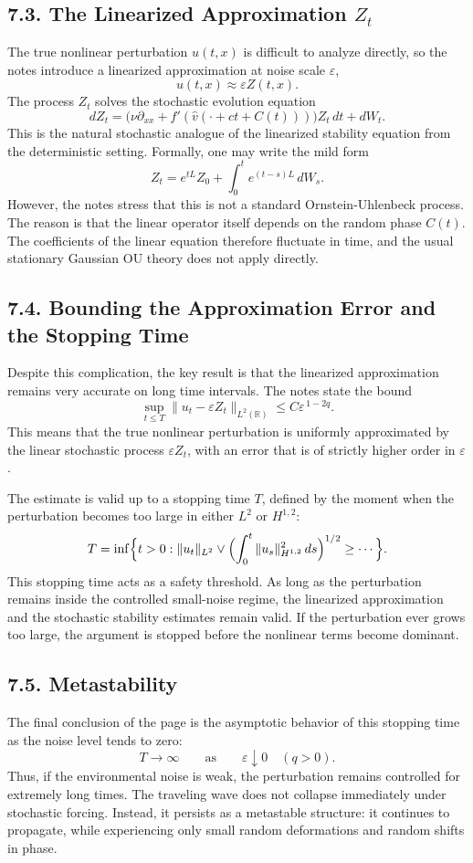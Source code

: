 \documentclass[11pt]{article}
\theoremstyle{definition}
\theoremstyle{remark}
\begin{document}
\subsection*{7.3. The Linearized Approximation \(Z_t\)}
The true nonlinear perturbation \(u(t,x)\) is difficult to analyze directly, so the notes introduce a linearized approximation at noise scale \(\varepsilon\),
\[
u(t,x)\approx \varepsilon Z(t,x).
\]
The process \(Z_t\) solves the stochastic evolution equation
\[
dZ_t=\bigl(\nu\partial_{xx}+f'(\widehat v(\cdot+ct+C(t)))\bigr)Z_t\,dt+dW_t.
\]
This is the natural stochastic analogue of the linearized stability equation from the deterministic setting. Formally, one may write the mild form
\[
Z_t=e^{tL}Z_0+\int_0^t e^{(t-s)L}\,dW_s.
\]
However, the notes stress that this is not a standard Ornstein-Uhlenbeck process. The reason is that the linear operator itself depends on the random phase \(C(t)\). The coefficients of the linear equation therefore fluctuate in time, and the usual stationary Gaussian OU theory does not apply directly.

\subsection*{7.4. Bounding the Approximation Error and the Stopping Time}
Despite this complication, the key result is that the linearized approximation remains very accurate on long time intervals. The notes state the bound
\[
\sup_{t\le T}\|u_t-\varepsilon Z_t\|_{L^2(\mathbb R)}
\le C\varepsilon^{\,1-2q}.
\]
This means that the true nonlinear perturbation is uniformly approximated by the linear stochastic process \(\varepsilon Z_t\), with an error that is of strictly higher order in \(\varepsilon\).

The estimate is valid up to a stopping time \(T\), defined by the moment when the perturbation becomes too large in either \(L^2\) or \(H^{1,2}\):
\[
T=\inf\Bigl\{t>0:\|u_t\|_{L^2}\vee
\Bigl(\int_0^t\|u_s\|_{H^{1,2}}^2\,ds\Bigr)^{1/2}\ge \cdots \Bigr\}.
\]
This stopping time acts as a safety threshold. As long as the perturbation remains inside the controlled small-noise regime, the linearized approximation and the stochastic stability estimates remain valid. If the perturbation ever grows too large, the argument is stopped before the nonlinear terms become dominant.

\subsection*{7.5. Metastability}
The final conclusion of the page is the asymptotic behavior of this stopping time as the noise level tends to zero:
\[
T\to\infty
\qquad\text{as}\qquad
\varepsilon\downarrow 0
\quad (q>0).
\]
Thus, if the environmental noise is weak, the perturbation remains controlled for extremely long times. The traveling wave does not collapse immediately under stochastic forcing. Instead, it persists as a metastable structure: it continues to propagate, while experiencing only small random deformations and random shifts in phase.
\end{document}

